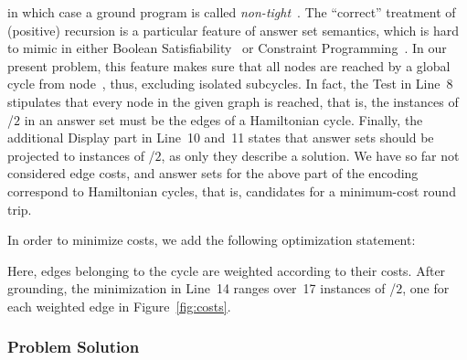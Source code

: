 in which case a ground program is called \emph{non-tight}~\cite{erdlif03a,fages94a}.
The ``correct'' treatment of (positive) recursion 
is a particular feature of answer set semantics,
which is hard to mimic in either
Boolean Satisfiability~\cite{bihemawa08a} or
Constraint Programming~\cite{robewa06a}.
In our present problem, this feature makes sure that all nodes are reached
by a global cycle from node~, thus, excluding isolated subcycles.
In fact, the Test in Line~8 stipulates that every node in the given graph
is reached, that is, the instances of /$2$ in an answer set
must be the edges of a Hamiltonian cycle.%
%
Finally, the additional Display part in Line~10 and~11 states that answer
sets should be projected to instances of /$2$, as only they
describe a solution.
We have so far not considered edge costs,
and answer sets for the above 
part of the encoding correspond to Hamiltonian cycles,
that is, candidates for a minimum-cost round trip.

In order to minimize costs,
we add the following optimization statement:
%

%
Here, edges belonging to the cycle are weighted according to their costs.
After grounding, the minimization in Line~14 ranges over~17 instances
of /$2$, one for each weighted edge in Figure~\ref{fig:costs}.

\subsubsection{Problem Solution}\label{subsec:tsp:solution}


